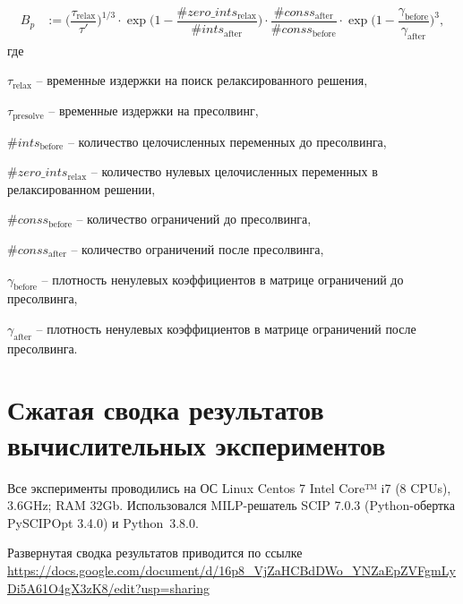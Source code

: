 \documentclass[%
	11pt,
	a4paper,
	utf8,
		]{article}
\begin{document}
\begin{align*}
B_p &:= \Big( \dfrac{ \tau_{\text{relax}} }{ \tau' } \Big) ^{1 / 3} \cdot \exp \bigg(1 - \dfrac{ \#zero\_ints_{\text{relax}} }{ \#ints_{\text{after} } } \Big) \cdot \dfrac{ \#conss_{\text{after}} }{ \#conss_{\text{before}} } \cdot \exp \bigg( 1 - \dfrac{ \gamma_{\text{before}} }{ \gamma_\text{after} } \bigg) ^ 3,
\end{align*}
где

\noindent$ \tau_{\text{relax}} $ -- временн\emph{ы}е издержки на поиск релаксированного решения,

\noindent$ \tau_{\text{presolve}} $ -- временн\emph{ы}е издержки на пресолвинг,

\noindent$ \#ints_{\text{before}} $ -- количество целочисленных переменных до пресолвинга,

\noindent$ \#zero\_ints_{\text{relax}} $ -- количество нулевых целочисленных переменных в релаксированном решении,

\noindent$ \#conss_{\text{before}} $ -- количество ограничений до пресолвинга,

\noindent$ \#conss_{\text{after}} $ -- количество ограничений после пресолвинга,

\noindent$ \gamma_{\text{before}} $ -- плотность ненулевых коэффициентов в матрице ограничений до пресолвинга,

\noindent$ \gamma_{\text{after}} $ -- плотность ненулевых коэффициентов в матрице ограничений после пресолвинга.

\section{Сжатая сводка результатов вычислительных экспериментов}

{
Все эксперименты проводились на ОС Linux Centos 7 Intel Core™ i7 (8 CPUs), 3.6GHz; RAM 32Gb. Использовался MILP-решатель SCIP 7.0.3 (Python-обертка PySCIPOpt 3.4.0) и Python~3.8.0.
}

Развернутая сводка результатов приводится по ссылке \url{https://docs.google.com/document/d/16p8_VjZaHCBdDWo_YNZaEpZVFgmLyDi5A61O4gX3zK8/edit?usp=sharing}
\end{document}
